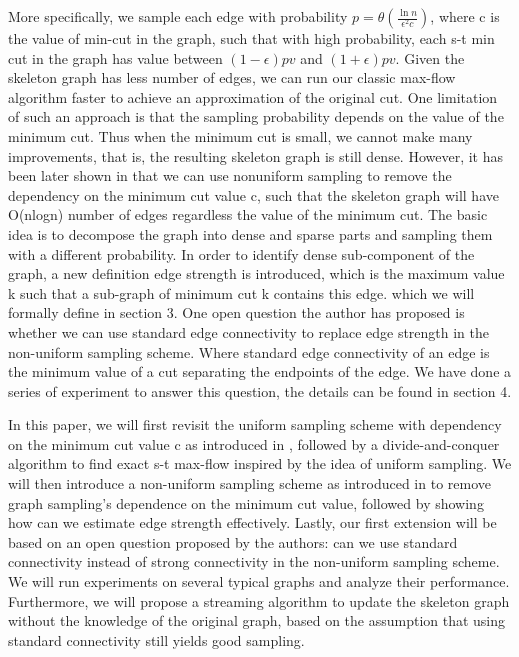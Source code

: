 \documentclass{article}
\begin{document}
More specifically, we sample each edge with probability $p = \theta (\frac{\ln{n}}{\epsilon^2c})$, where c is the value of min-cut in the graph, such that with high probability, each s-t min cut in the graph has value between $(1-\epsilon)pv$ and $(1+\epsilon)pv$. Given the skeleton graph has less number of edges, we can run our classic max-flow algorithm faster to achieve an approximation of the original cut. One limitation of such an approach is that the sampling probability depends on the value of the minimum cut. Thus when the minimum cut is small, we cannot make many improvements, that is, the resulting skeleton graph is still dense. However, it has been later shown in \citep{benczur2015randomized} that we can use nonuniform sampling to remove the dependency on the minimum cut value c, such that the skeleton graph will have O(nlogn) number of edges regardless the value of the minimum cut. The basic idea is to decompose the graph into dense and sparse parts and sampling them with a different probability. In order to identify dense sub-component of the graph, a new definition edge strength is introduced, which is the maximum value k such that a sub-graph of minimum cut k contains this edge. which we will formally define in section 3. One open question the author has proposed is whether we can use standard edge connectivity to replace edge strength in the non-uniform sampling scheme. Where standard edge connectivity of an edge is the minimum value of a cut separating the endpoints of the edge. We have done a series of experiment to answer this question, the details can be found in section 4.

In this paper, we will first revisit the uniform sampling scheme with dependency on the minimum cut value c as introduced in \citep{karger1999random}, followed by a divide-and-conquer algorithm to find exact s-t max-flow inspired by the idea of uniform sampling. We will then introduce a non-uniform sampling scheme as introduced in \citep{benczur2015randomized} to remove graph sampling's dependence on the minimum cut value, followed by showing how can we estimate edge strength effectively. Lastly, our first extension will be based on an open question proposed by the authors: can we use standard connectivity instead of strong connectivity in the non-uniform sampling scheme. We will run experiments on several typical graphs and analyze their performance. Furthermore, we will propose a streaming algorithm to update the skeleton graph without the knowledge of the original graph, based on the assumption that using standard connectivity still yields good sampling. 
\end{document}
